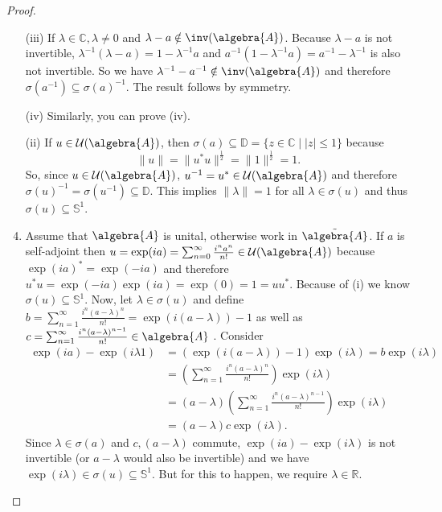 \documentclass[a4paper]{article}
\newcommand{\unitcircle}{\mathds{S}^1}
\begin{document}
\begin{proof}
	\begin{enumerate}
		\item[(iii)] If $\lambda \in \mathds{C}, \lambda \neq 0$ and $\lambda - a \notin \inv(\algebra{A})$.
		Because $\lambda - a$ is not invertible, $\lambda^{-1}(\lambda - a) = 1 - \lambda^{-1} a$ and $a^{-1}(1 - \lambda^{-1} a) = a^{-1} - \lambda^{-1}$ is also not invertible.
		So we have $\lambda^{-1} - a^{-1} \notin \inv(\algebra{A})$ and therefore $\sigma(a^{-1}) \subseteq \sigma(a)^{-1}$.
		The result follows by symmetry.
		\item[(iv)] Similarly, you can prove (iv).
		\item[(ii)] If $u \in \mathcal{U}(\algebra{A})$, then $\sigma(a) \subseteq \mathds{D} = \{z \in \mathds{C} \mid |z| \leq 1 \}$ because 
		\begin{equation*}
			\|u\| = \|u^* u\|^{\frac{1}{2}} = \|1\|^\frac{1}{2} = 1\text{.}
		\end{equation*}
		So, since $u \in \mathcal{U}(\algebra{A})$, $u^{-1}=u^* \in \mathcal{U}(\algebra{A})$ and therefore $\sigma(u)^{-1} = \sigma(u^{-1}) \subseteq \mathds{D}$.
		This implies $\|\lambda\| = 1$ for all $\lambda \in \sigma(u)$ and thus $\sigma(u) \subseteq \unitcircle$.
		\item Assume that $\algebra{A}$ is unital, otherwise work in $\tilde{\algebra{A}}$. If $a$ is self-adjoint then $u = \exp(i a) = \sum_{n=0}^{\infty} \frac{i^n a^n}{n!} \in \mathcal{U}(\algebra{A})$ because $
		\exp(i a)^* = \exp(- i a)$ and therefore $u^* u = \exp(-i a) \exp(i a) = \exp(0) = 1 = u u^*$.
		Because of (i) we know $\sigma(u) \subseteq \unitcircle$.
		Now, let $\lambda \in \sigma(u)$ and define $b = \sum_{n=1}^{\infty} \frac{i^n (a-\lambda)^n}{n!} = \exp(i(a - \lambda)) - 1$ as well as $c = \sum_{n = 1}^{\infty} \frac{i^n (a - \lambda)^{n-1}}{n!} \in \algebra{A}$ .
		Consider
		\begin{align*}
			\exp(i a) - \exp(i \lambda 1) &= (\exp(i (a - \lambda)) - 1)  \exp(i \lambda) = b \exp(i \lambda)\\
			&= \left( \sum_{n = 1}^{\infty} \frac{i^n (a - \lambda)^n}{n!} \right) \exp(i \lambda) \\ 
			&= (a - \lambda) \left( \sum_{n = 1}^{\infty} \frac{i^n (a - \lambda)^{n-1}}{n!} \right) \exp(i \lambda)\\
			&= (a - \lambda) c \exp(i \lambda)\text{.}
		\end{align*}
		Since $\lambda \in \sigma(a)$ and $c, (a - \lambda)$ commute, $\exp(i a) - \exp(i \lambda)$ is not invertible (or $a - \lambda$ would also be invertible) and we have $\exp(i \lambda) \in \sigma(u) \subseteq \unitcircle$.
		But for this to happen, we require $\lambda \in \mathds{R}$.
	\end{enumerate}
\end{proof}
\end{document}
